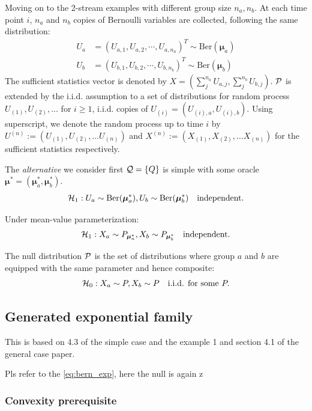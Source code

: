 Moving on to the 2-stream examples with different group size $n_a, n_b$.
At each time point $i$, $n_a$ and $n_b$ copies of Bernoulli variables are collected,
following the same distribution:
\begin{align*}
	U_a & = (U_{a,1}, U_{a,2},\cdots,U_{a,n_a})^T \sim \mathrm{Ber}(\bm{\mu}_a) \\
	U_b & = (U_{b,1}, U_{b,2},\cdots,U_{b,n_b})^T \sim \mathrm{Ber}(\bm{\mu}_b)
\end{align*}
The sufficient statistics vector is denoted by $X = (\sum_j^{n_a}U_{a,j}, \sum_j^{n_b}U_{b,j})$.
$\mathcal{P}$ is extended by the i.i.d. assumption to
a set of distributions for random process $U_{(1)}, U_{(2)}, \dots$
for $i \geq 1$, i.i.d. copies of $U_{(i)}=(U_{(i),a}, U_{(i),b})$.
Using superscript, we denote the random process up to time $i$ by
$U^{(n)} := (U_{(1)}, U_{(2)}, \dots U_{(n)})$
and $X^{(n)} := (X_{(1)}, X_{(2)}, \dots X_{(n)})$ for the sufficient statistics respectively.

The \emph{alternative} we consider first $\mathcal{Q} = \{Q\}$ is simple with some oracle
$\bm{\mu}^* = (\bm{\mu}_a^*, \bm{\mu}_b^*)$.
\begin{align*}
	\hypA: U_a \sim \mathrm{Ber}(\bm{\mu}_a^*), U_b \sim \mathrm{Ber}(\bm{\mu}_b^*) \quad
	\text{independent}.
\end{align*}

Under mean-value parameterization:
\begin{align*}
	\hypA: X_a \sim P_{\bm{\mu}_a^*}, X_b \sim P_{\bm{\mu}_b^*} \quad
	\text{independent}.
\end{align*}

The null distribution $\mathcal{P}$ is the set of distributions where group $a$ and $b$
are equipped with the same parameter and hence composite:
\begin{align*}
	\hypN: X_a \sim P, X_b \sim P \quad
	\text{i.i.d. for some } P.
\end{align*}


\subsection{Generated exponential family}

This is based on 4.3 of the simple case and the example 1 and section 4.1 of the general case paper.

Pls refer to the \eqref{eq:bern_exp}, here the null is again z

\subsubsection{Convexity prerequisite}

